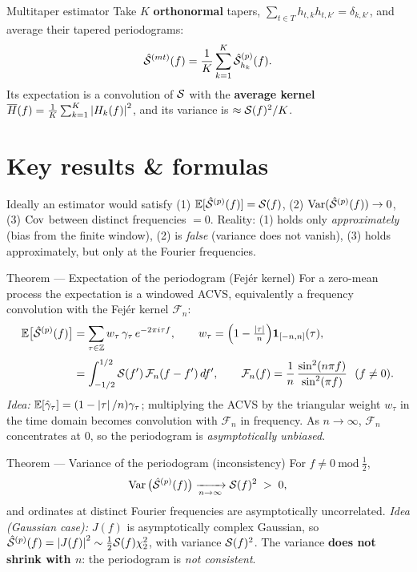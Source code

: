 \documentclass[11pt]{article}
\newcommand{\Fej}{\mathcal{F}}   %
\begin{document}
\begin{defn}{Multitaper estimator}
Take $K$ \textbf{orthonormal} tapers, $\sum_{t\in T} h_{t,k}h_{t,k'}=\delta_{k,k'}$, and average their tapered periodograms:
\[
\hat{\mathcal{S}}^{(mt)}(f)=\frac1K\sum_{k=1}^{K}\hat{\mathcal{S}}^{(p)}_{h_k}(f).
\]
Its expectation is a convolution of $\mathcal{S}$ with the \textbf{average kernel} $\overline H(f)=\tfrac1K\sum_{k=1}^K\left\lvert H_k(f) \right\rvert^2$, and its variance is $\approx \mathcal{S}(f)^2/K$.
\end{defn}

\section*{Key results \& formulas}

Ideally an estimator would satisfy (1) $\mathbb{E}[\hat{\mathcal{S}}^{(p)}(f)]=\mathcal{S}(f)$, (2) $\operatorname{Var}(\hat{\mathcal{S}}^{(p)}(f))\to0$, (3) $\operatorname{Cov}$ between distinct frequencies $=0$. Reality: (1) holds only \emph{approximately} (bias from the finite window), (2) is \emph{false} (variance does not vanish), (3) holds approximately, but only at the Fourier frequencies.

\begin{result}{Theorem --- Expectation of the periodogram (Fej\'er kernel)}
For a zero-mean process the expectation is a windowed ACVS, equivalently a frequency convolution with the Fej\'er kernel $\Fej_n$:
\[
\begin{aligned}
\E\big[\hat\sdf^{(p)}(f)\big]
&=\sum_{\tau\in\Ints} w_\tau\,\acvs_\tau\,e^{-2\pi i\tau f},
\qquad w_\tau=\Big(1-\tfrac{\abs\tau}{n}\Big)\ind_{[-n,n]}(\tau),\\[2pt]
&=\int_{-1/2}^{1/2}\sdf(f')\,\Fej_n(f-f')\,df',
\qquad
\Fej_n(f)=\frac1n\,\frac{\sin^2(n\pi f)}{\sin^2(\pi f)}\ \ (f\ne0).
\end{aligned}
\]
\textit{Idea:} $\mathbb{E}[\hat{\gamma}_\tau]=(1-\left\lvert \tau \right\rvert/n)\gamma_\tau$; multiplying the ACVS by the triangular weight $w_\tau$ in the time domain becomes convolution with $\Fej_n$ in frequency. As $n\to\infty$, $\Fej_n$ concentrates at $0$, so the periodogram is \emph{asymptotically unbiased}.
\end{result}

\begin{result}{Theorem --- Variance of the periodogram (inconsistency)}
For $f\ne0\ \mathrm{mod}\ \tfrac12$,
\[
\operatorname{Var}\big(\hat{\mathcal{S}}^{(p)}(f)\big)\xrightarrow[n\to\infty]{}\mathcal{S}(f)^2 \;>\;0,
\]
and ordinates at distinct Fourier frequencies are asymptotically uncorrelated. \textit{Idea (Gaussian case):} $J(f)$ is asymptotically complex Gaussian, so $\hat{\mathcal{S}}^{(p)}(f)=\left\lvert J(f) \right\rvert^2\sim\tfrac12\mathcal{S}(f)\chi^2_2$, with variance $\mathcal{S}(f)^2$. The variance \textbf{does not shrink with $n$}: the periodogram is \emph{not consistent}.
\end{result}
\end{document}
